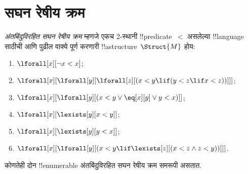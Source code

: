 \documentclass[../../../include/open-logic-section]{subfiles}
\begin{document}
\section{सघन रेषीय क्रम}

\begin{defn}
  \emph{अंतबिंदुविरहित सघन रेषीय क्रम} म्हणजे एकच 2-स्थानी
  !!{predicate}~$<$ असलेल्या !!{language} साठीची आणि पुढील वाक्ये पूर्ण
  करणारी !!a{structure}~$\Struct{M}$ होय:
  \begin{enumerate}
  \item $\lforall[x][\lnot x < x]$;
  \item $\lforall[x][\lforall[y][\lforall[z][(x < y \lif (y < z \lif x
    <z ))]]]$;
  \item $\lforall[x][\lforall[y][(x< y \lor \eq[x][y] \lor y < x)]]$;
  \item $\lforall[x][\lexists[y][x < y]]$;
  \item $\lforall[x][\lexists[y][y < x]]$;
  \item $\lforall[x][\lforall[y][(x < y \lif \lexists[z][(x < z \land
        z < y))]]]$.
 \end{enumerate}
\end{defn}

\begin{thm}
  कोणतेही दोन !!{enumerable} अंतबिंदुविरहित सघन रेषीय क्रम समरूपी
  असतात.
\end{thm}
\end{document}
